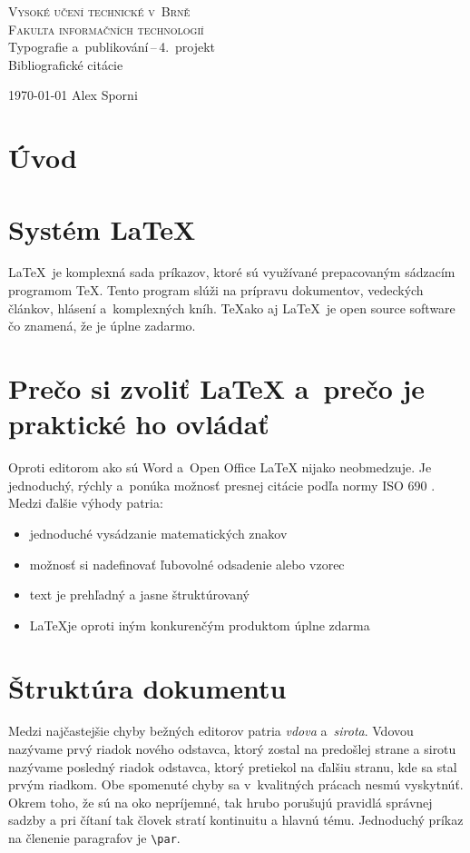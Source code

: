 \documentclass[a4paper,11pt]{article}
\begin{document}
\begin{titlepage}
		\begin{center}
			\Huge
			\textsc{Vysoké učení technické v~Brně} \\
			\huge
			\textsc{Fakulta informačních technologií} \\
			\LARGE
			Typografie a~publikování\,--\,4.~projekt \\
			\Huge
			Bibliografické citácie
		\end{center}

		{\Large
			\today
			\hfill
			Alex Sporni
		}
\end{titlepage}

\section{Úvod}
\emph{} 
\cite{Rybicka2003}
\section{Systém \LaTeX}
\LaTeX\ je komplexná sada príkazov, ktoré sú využívané prepacovaným sádzacím programom \TeX. Tento program slúži na prípravu dokumentov, vedeckých článkov, hlásení a~komplexných kníh. \TeX ako aj \LaTeX\ je open source software čo znamená, že je úplne zadarmo. \cite{Kopka2004}
\section{Prečo si zvoliť {\LaTeX} a~prečo je praktické ho ovládať}
Oproti editorom ako sú Word a~Open Office {\LaTeX} nijako neobmedzuje. Je jednoduchý, rýchly a~ponúka možnosť presnej citácie podľa normy ISO 690 \cite{Martinek2013}. Medzi ďalšie výhody patria:
\begin{itemize}
\item jednoduché vysádzanie matematických znakov
\item možnosť si nadefinovať ľubovolné odsadenie alebo vzorec
\item text je prehľadný a jasne štruktúrovaný
\item \LaTeX je oproti iným konkurenčým produktom úplne zdarma \cite{Found2013}
\end{itemize}
\section{Štruktúra dokumentu}
Medzi najčastejšie chyby bežných editorov patria \textit{vdova} a~\textit{sirota}. 
Vdovou nazývame prvý riadok nového odstavca, ktorý zostal na predošlej strane a sirotu nazývame posledný riadok odstavca, ktorý pretiekol na ďalšiu stranu, kde sa stal prvým riadkom. 
Obe spomenuté chyby sa v~kvalitných prácach nesmú vyskytnúť. Okrem toho, že sú na oko nepríjemné, tak hrubo porušujú  pravidlá správnej sadzby a pri čítaní tak človek stratí kontinuitu a hlavnú tému. Jednoduchý príkaz na členenie paragrafov je \verb|\par|. \cite{root2001}
\end{document}
